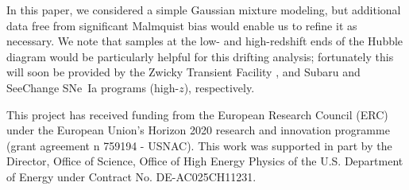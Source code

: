 \documentclass[]{aa}
\begin{document}
In this paper, we considered a simple Gaussian mixture modeling, but additional
data free from significant Malmquist bias would enable us to refine it as
necessary. We note that samples at the low- and high-redshift ends of the Hubble
diagram would be particularly helpful for this drifting analysis; fortunately
this will soon be provided by the Zwicky Transient Facility
\citep[low-$z$,][]{bellm2019, graham2019}, and Subaru and SeeChange SNe~Ia
programs (high-$z$), respectively. 

\begin{acknowledgements}
    This project has received funding from the European Research Council (ERC)
    under the European Union's Horizon 2020 research and innovation programme
    (grant agreement n 759194 - USNAC).
    This work was supported in part by the Director, Office of Science, Office
    of High Energy Physics of the U.S.  Department of Energy under Contract No.
    DE-AC025CH11231.
\end{acknowledgements}
\end{document}
